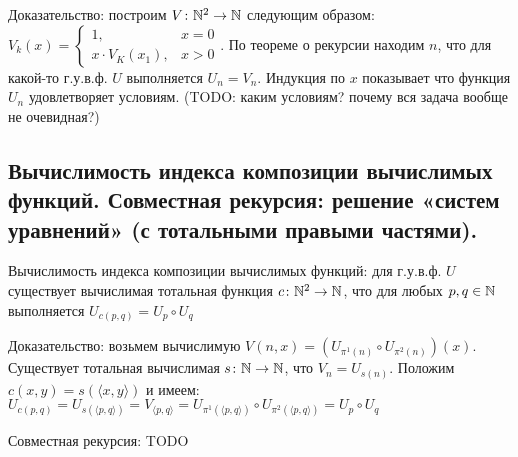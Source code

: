 \documentclass[a4paper, 10pt]{article}
\begin{document}
Доказательство: построим $V\colon\mathbb{N}^2\to\mathbb{N}$ следующим образом: $V_k(x)=\begin{cases}
    1,&x=0 \\ x\cdot V_K(x_1),&x>0
\end{cases}$. По теореме о рекурсии находим $n$, что для какой-то г.у.в.ф. $U$ выполняется $U_n=V_n$. Индукция по $x$ показывает что функция $U_n$ удовлетворяет условиям. (TODO: каким условиям? почему вся задача вообще не очевидная?)

\subsection{Вычислимость индекса композиции вычислимых функций. Совместная рекурсия: решение «систем уравнений» (с тотальными правыми частями).}

Вычислимость индекса композиции вычислимых функций: для г.у.в.ф. $U$ существует вычислимая тотальная функция $c\colon\mathbb{N}^2\to\mathbb{N}$, что для любых $p,q\in\mathbb{N}$ выполняется $U_{c(p,q)}=U_p \circ U_q$

Доказательство: возьмем вычислимую $V(n,x)=(U_{\pi^1(n)}\circ U_{\pi^2(n)})(x)$. Существует тотальная вычислимая $s\colon\mathbb{N}\to\mathbb{N}$, что $V_n=U_{s(n)}$. Положим $c(x,y)=s(\langle x,y \rangle)$ и имеем: $U_{c(p,q)}=U_{s(\langle p,q\rangle)}=V_{\langle p,q \rangle}=U_{\pi^1(\langle p,q \rangle)}\circ U_{\pi^2(\langle p,q \rangle)}=U_p \circ U_q$

\hfill

Совместная рекурсия: TODO
\end{document}
